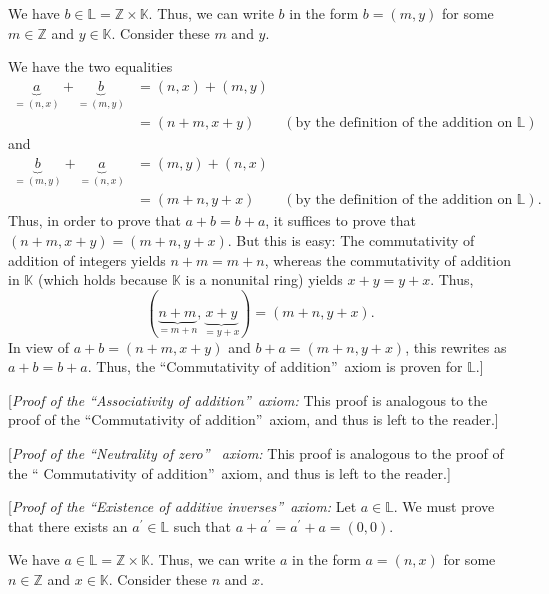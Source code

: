 \documentclass[paper=a4, fontsize=12pt]{scrartcl}%
\theoremstyle{plainsl}
\theoremstyle{definition}
\theoremstyle{remark}
\begin{document}
We have $b\in\mathbb{L}=\mathbb{Z}\times\mathbb{K}$. Thus, we can write $b$ in
the form $b=\left(  m,y\right)  $ for some $m\in\mathbb{Z}$ and $y\in
\mathbb{K}$. Consider these $m$ and $y$.

We have the two equalities%
\begin{align*}
\underbrace{a}_{=\left(  n,x\right)  }+\underbrace{b}_{=\left(  m,y\right)  }
&  =\left(  n,x\right)  +\left(  m,y\right) \\
&  =\left(  n+m,x+y\right)  \qquad\left(  \text{by the definition of the
addition on }\mathbb{L}\right)
\end{align*}
and%
\begin{align*}
\underbrace{b}_{=\left(  m,y\right)  }+\underbrace{a}_{=\left(  n,x\right)  }
&  =\left(  m,y\right)  +\left(  n,x\right) \\
&  =\left(  m+n,y+x\right)  \qquad\left(  \text{by the definition of the
addition on }\mathbb{L}\right)  .
\end{align*}
Thus, in order to prove that $a+b=b+a$, it suffices to prove that $\left(
n+m,x+y\right)  =\left(  m+n,y+x\right)  $. But this is easy: The
commutativity of addition of integers yields $n+m=m+n$, whereas the
commutativity of addition in $\mathbb{K}$ (which holds because $\mathbb{K}$ is
a nonunital ring) yields $x+y=y+x$. Thus,
\[
\left(  \underbrace{n+m}_{=m+n},\underbrace{x+y}_{=y+x}\right)  =\left(
m+n,y+x\right)  .
\]
In view of $a+b=\left(  n+m,x+y\right)  $ and $b+a=\left(  m+n,y+x\right)  $,
this rewrites as $a+b=b+a$. Thus, the \textquotedblleft Commutativity of
addition\textquotedblright\ axiom is proven for $\mathbb{L}$.]

[\textit{Proof of the \textquotedblleft Associativity of
addition\textquotedblright\ axiom:} This proof is analogous to the proof of
the \textquotedblleft Commutativity of addition\textquotedblright\ axiom, and
thus is left to the reader.]

[\textit{Proof of the \textquotedblleft Neutrality of zero\textquotedblright%
\ axiom:} This proof is analogous to the proof of the \textquotedblleft
Commutativity of addition\textquotedblright\ axiom, and thus is left to the reader.]

[\textit{Proof of the \textquotedblleft Existence of additive
inverses\textquotedblright\ axiom:} Let $a\in\mathbb{L}$. We must prove that
there exists an $a^{\prime}\in\mathbb{L}$ such that $a+a^{\prime}=a^{\prime
}+a=\left(  0,0\right)  $.

We have $a\in\mathbb{L}=\mathbb{Z}\times\mathbb{K}$. Thus, we can write $a$ in
the form $a=\left(  n,x\right)  $ for some $n\in\mathbb{Z}$ and $x\in
\mathbb{K}$. Consider these $n$ and $x$.
\end{document}
